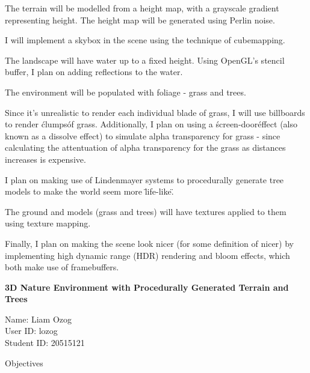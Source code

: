 \documentclass{article}
\newcommand\projecttitle{3D Nature Environment with Procedurally Generated Terrain and Trees}
\newcommand\myname{Liam Ozog}
\newcommand\myuserid{lozog}
\newcommand\mystudentid{20515121}
\begin{document}
\begin{description}
    The terrain will be modelled from a height map, with a grayscale gradient representing height. The height map will be generated using Perlin noise.

    I will implement a skybox in the scene using the technique of cubemapping.

    The landscape will have water up to a fixed height. Using OpenGL's stencil buffer, I plan on adding reflections to the water.

    The environment will be populated with foliage - grass and trees. 

    Since it's unrealistic to render each individual blade of grass, I will use billboards to render \'clumps\' of grass. Additionally, I plan on using a \'screen-door\' effect (also known as a dissolve effect) to simulate alpha transparency for grass - since calculating the attentuation of alpha transparency for the grass as distances increases is expensive.

    I plan on making use of Lindenmayer systems to procedurally generate tree models to make the world seem more \"life-like\".

    The ground and models (grass and trees) will have textures applied to them using texture mapping. 

    Finally, I plan on making the scene look nicer (for some definition of nicer) by implementing high dynamic range (HDR) rendering and bloom effects, which both make use of framebuffers.

\end{description}

\newpage

{\huge \bf 
	\projecttitle 
}

\medskip
Name: \myname \\ 
User ID: \myuserid \\ 
Student ID: \mystudentid 

\bigskip
{\Large Objectives}
\end{document}
